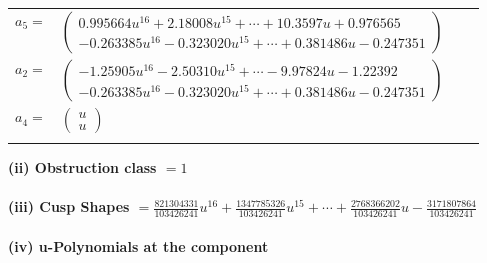 \documentclass[1p]{elsarticle_modified}
\theoremstyle{definition}
\begin{document}
\begin{tabular}{m{7pt} m{180pt} m{7pt} m{180pt} }
\flushright $a_{5}=$&$\begin{pmatrix}0.995664 u^{16}+2.18008 u^{15}+\cdots+10.3597 u+0.976565\\-0.263385 u^{16}-0.323020 u^{15}+\cdots+0.381486 u-0.247351\end{pmatrix}$ \\
\flushright $a_{2}=$&$\begin{pmatrix}-1.25905 u^{16}-2.50310 u^{15}+\cdots-9.97824 u-1.22392\\-0.263385 u^{16}-0.323020 u^{15}+\cdots+0.381486 u-0.247351\end{pmatrix}$ \\
\flushright $a_{4}=$&$\begin{pmatrix}u\\u\end{pmatrix}$\\&\end{tabular}
\flushleft \textbf{(ii) Obstruction class $= 1$}\\~\\
\flushleft \textbf{(iii) Cusp Shapes $= \frac{821304331}{103426241} u^{16}+\frac{1347785326}{103426241} u^{15}+\cdots+\frac{2768366202}{103426241} u-\frac{3171807864}{103426241}$}\\~\\
\newpage\renewcommand{\arraystretch}{1}
\flushleft \textbf{(iv) u-Polynomials at the component}\newline \\
\end{document}
